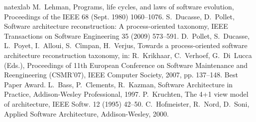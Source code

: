 \documentclass[preprint,12pt]{elsarticle}
\begin{document}

%
\begin{thebibliography}{49}
\expandafter\ifx\csname natexlab\endcsname\relax\def\natexlab#1{#1}\fi
\providecommand{\bibinfo}[2]{#2}
\ifx\xfnm\relax \def\xfnm[#1]{\unskip,\space#1}\fi
\bibinfo{author}{M.~Lehman},
\newblock \bibinfo{title}{Programs, life cycles, and laws of software
  evolution},
\newblock \bibinfo{journal}{Proceedings of the IEEE} \bibinfo{volume}{68}
  (\bibinfo{year}{Sept. 1980}) \bibinfo{pages}{1060--1076}.
\bibinfo{author}{S.~Ducasse}, \bibinfo{author}{D.~Pollet},
\newblock \bibinfo{title}{Software architecture reconstruction: A
  process-oriented taxonomy},
\newblock \bibinfo{journal}{IEEE Transactions on Software Engineering}
  \bibinfo{volume}{35} (\bibinfo{year}{2009}) \bibinfo{pages}{573--591}.
\bibinfo{author}{D.~Pollet}, \bibinfo{author}{S.~Ducasse},
  \bibinfo{author}{L.~Poyet}, \bibinfo{author}{I.~Alloui},
  \bibinfo{author}{S.~C\^impan}, \bibinfo{author}{H.~Verjus},
\newblock \bibinfo{title}{Towards a process-oriented software architecture
  reconstruction taxonomy},
\newblock in: \bibinfo{editor}{R.~Krikhaar}, \bibinfo{editor}{C.~Verhoef},
  \bibinfo{editor}{G.~Di~Lucca} (Eds.), \bibinfo{booktitle}{Proceedings of 11th
  European Conference on Software Maintenance and Reengineering (CSMR'07)},
  \bibinfo{publisher}{IEEE Computer Society}, \bibinfo{year}{2007}, pp.
  \bibinfo{pages}{137--148}. \bibinfo{note}{Best Paper Award}.
\bibinfo{author}{L.~Bass}, \bibinfo{author}{P.~Clements},
  \bibinfo{author}{R.~Kazman}, \bibinfo{title}{Software Architecture in
  Practice}, \bibinfo{publisher}{{Addison-Wesley Professional}},
  \bibinfo{year}{1997}.
\bibinfo{author}{P.~Kruchten},
\newblock \bibinfo{title}{The 4+1 view model of architecture},
\newblock \bibinfo{journal}{IEEE Softw.} \bibinfo{volume}{12}
  (\bibinfo{year}{1995}) \bibinfo{pages}{42--50}.
\bibinfo{author}{C.~Hofmeister}, \bibinfo{author}{R.~Nord},
  \bibinfo{author}{D.~Soni}, \bibinfo{title}{Applied Software Architecture},
  \bibinfo{publisher}{Addison-Wesley}, \bibinfo{year}{2000}.

\end{thebibliography}
\end{document}
